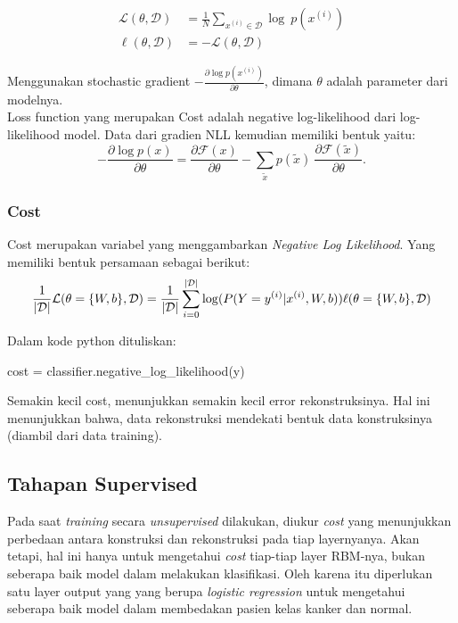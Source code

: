 \begin{equation}
\begin{aligned}
\mathcal{L}(\theta, \mathcal{D}) &= \frac{1}{N} \sum_{x^{(i)} \in
\mathcal{D}} \log\ p(x^{(i)}) \\
\ell (\theta, \mathcal{D}) &= - \mathcal{L} (\theta, \mathcal{D})
\end{aligned}
\end{equation}


Menggunakan stochastic gradient $-\frac{\partial  \log p(x^{(i)})}{\partial
\theta}$, dimana $\theta$ adalah parameter dari modelnya.\\
Loss function yang merupakan Cost adalah  negative log-likelihood dari log-likelihood model. Data dari gradien NLL kemudian memiliki bentuk yaitu:
\begin{equation}
- \frac{\partial  \log p(x)}{\partial \theta}
 = \frac{\partial \mathcal{F}(x)}{\partial \theta} -
       \sum_{\tilde{x}} p(\tilde{x}) \
           \frac{\partial \mathcal{F}(\tilde{x})}{\partial \theta}.
\end{equation}

\subsubsection{Cost}
Cost merupakan variabel yang menggambarkan \textit{Negative Log Likelihood}. Yang memiliki bentuk persamaan sebagai berikut:
\begin{equation}
\frac{1}{|\mathcal{D}|} \mathcal{L} (\theta=\{W,b\}, \mathcal{D}) =
            \frac{1}{|\mathcal{D}|} \sum_{i=0}^{|\mathcal{D}|}
                \log(P(Y=y^{(i)}|x^{(i)}, W,b)) \\
            \ell (\theta=\{W,b\}, \mathcal{D})
\end{equation}

Dalam kode python dituliskan:
\begin{center}
cost = classifier.negative\_log\_likelihood(y)
\end{center}

Semakin kecil cost, menunjukkan semakin kecil error rekonstruksinya. Hal ini menunjukkan bahwa, data rekonstruksi mendekati bentuk data konstruksinya (diambil dari data training).


\subsection{Tahapan Supervised}
Pada saat \textit{training}  secara \textit{unsupervised} dilakukan, diukur \textit{cost} yang menunjukkan perbedaan antara konstruksi dan rekonstruksi pada tiap layernyanya. Akan tetapi, hal ini hanya untuk mengetahui \textit{cost} tiap-tiap layer RBM-nya, bukan seberapa baik model dalam melakukan klasifikasi. Oleh karena itu diperlukan satu layer output yang yang berupa \textit{logistic regression} untuk mengetahui seberapa baik model dalam membedakan pasien kelas kanker dan normal.


